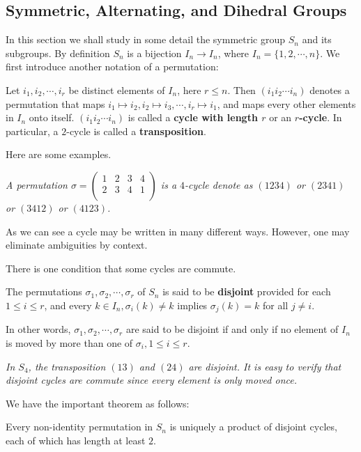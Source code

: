 \subsection{Symmetric, Alternating, and Dihedral Groups}
In this section we shall study in some detail the symmetric group $S_n$ and its subgroups. By definition $S_n$ is a bijection $I_n\to I_n$, where $I_n=\{1,2,\cdots,n\}$. We first introduce another notation of a permutation:
\begin{definition}
Let $i_1,i_2,\cdots,i_r$ be distinct elements of $I_n$, here $r\le n$. Then $(i_1i_2\cdots i_n)$ denotes a permutation that maps $i_1\mapsto i_2,i_2\mapsto i_3,\cdots,i_r\mapsto i_1$, and maps every other elements in $I_n$ onto itself. $(i_1i_2\cdots i_n)$ is called a \textbf{cycle with length $r$} or an \textbf{$r$-cycle}. In particular, a $2$-cycle is called a \textbf{transposition}.
\end{definition}
Here are some examples.
\begin{example}\em
A permutation $
\sigma =\left( \begin{matrix}
	1&		2&		3&		4\\
	2&		3&		4&		1\\
\end{matrix} \right) 
$ is a $4$-cycle denote as $(1234)$ or $(2341)$ or $(3412)$ or $(4123)$.
\end{example}
As we can see a cycle may be written in many different ways. However, one may eliminate ambiguities by context.\par
There is one condition that some cycles are commute.
\begin{definition}
The permutations $\sigma_1,\sigma_2,\cdots,\sigma_r$ of $S_n$ is said to be \textbf{disjoint} provided for each $1\le i\le r$, and every $k\in I_n,\sigma_i(k)\ne k$ implies $\sigma_j(k)=k$ for all $j\ne i$.
\end{definition}
In other words, $\sigma_1,\sigma_2,\cdots,\sigma_r$ are said to be disjoint if and only if no element of $I_n$ is moved by more than one of $\sigma_i,1\le i\le r$.
\begin{example}\em
In $S_4$, the transposition $(13)$ and $(24)$ are disjoint. It is easy to verify that disjoint cycles are commute since every element is only moved once.
\end{example}
We have the important theorem as follows:
\begin{theorem}
Every non-identity permutation in $S_n$ is uniquely a product of disjoint cycles, each of which has length at least $2$.
\end{theorem}
